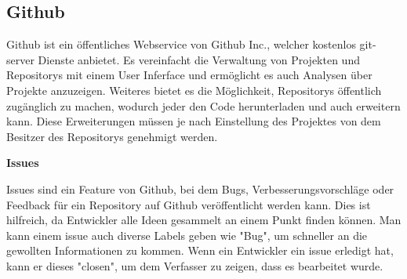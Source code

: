 \subsection{Github}\label{subsec:github}


\renewcommand{\kapitelautor}{Autor: Felix Zwickelstorfer}
Github ist ein öffentliches Webservice von Github Inc., welcher kostenlos git-server Dienste anbietet.
Es vereinfacht die Verwaltung von Projekten und Repositorys mit einem User Inferface und ermöglicht es auch Analysen über Projekte anzuzeigen.
Weiteres bietet es die Möglichkeit, Repositorys öffentlich zugänglich zu machen, wodurch jeder den Code herunterladen und auch erweitern kann.
Diese Erweiterungen müssen je nach Einstellung des Projektes von dem Besitzer des Repositorys genehmigt werden.


\textbf{Issues}

Issues sind ein Feature von Github, bei dem Bugs, Verbesserungsvorschläge oder Feedback für ein Repository auf Github veröffentlicht werden kann.
Dies ist hilfreich, da Entwickler alle Ideen gesammelt an einem Punkt finden können.
Man kann einem issue auch diverse Labels geben wie \zB "Bug", um schneller an die gewollten Informationen zu kommen.
Wenn ein Entwickler ein issue erledigt hat, kann er dieses "closen", um dem Verfasser zu zeigen, dass es bearbeitet wurde.


\renewcommand{\kapitelautor}{}